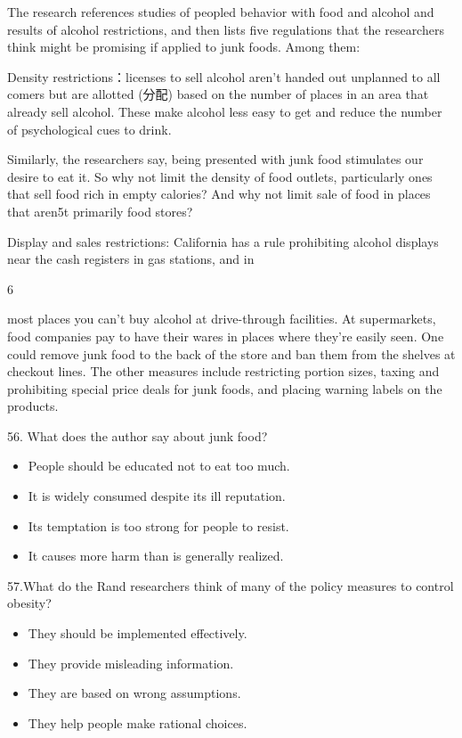 \documentclass[UTF8,11pt]{ctexart}
\begin{document}
The research references studies of peopled behavior with food and alcohol and results of alcohol restrictions, and then lists five regulations that the researchers think might be promising if applied to junk foods. Among them:


Density restrictions：licenses to sell alcohol aren’t handed out unplanned to all comers but are allotted (分配) based on the number of places in an area that already sell alcohol. These make alcohol less easy to get and reduce the number of psychological cues to drink.


Similarly, the researchers say, being presented with junk food stimulates our desire to eat it. So why not limit the density of food outlets, particularly ones that sell food rich in empty calories? And why not limit sale of food in places that aren5t primarily food stores?


Display and sales restrictions: California has a rule prohibiting alcohol displays near the cash registers in gas stations, and in


6


most places you can’t buy alcohol at drive-through facilities. At supermarkets, food companies pay to have their wares in places where they’re easily seen. One could remove junk food to the back of the store and ban them from the shelves at checkout lines. The other measures include restricting portion sizes, taxing and prohibiting special price deals for junk foods, and placing warning labels on the products.


56. What does the author say about junk food?


\begin{itemize}[leftmargin=2em,itemsep=.2em,topsep=.4em]\item[A.] People should be educated not to eat too much.
\item[B.] It is widely consumed despite its ill reputation.
\item[C.] Its temptation is too strong for people to resist.
\item[D.] It causes more harm than is generally realized.
\end{itemize}

57.What do the Rand researchers think of many of the policy measures to control obesity?


\begin{itemize}[leftmargin=2em,itemsep=.2em,topsep=.4em]\item[A.] They should be implemented effectively.
\item[B.] They provide misleading information.
\item[C.] They are based on wrong assumptions.
\item[D.] They help people make rational choices.
\end{itemize}
\end{document}
